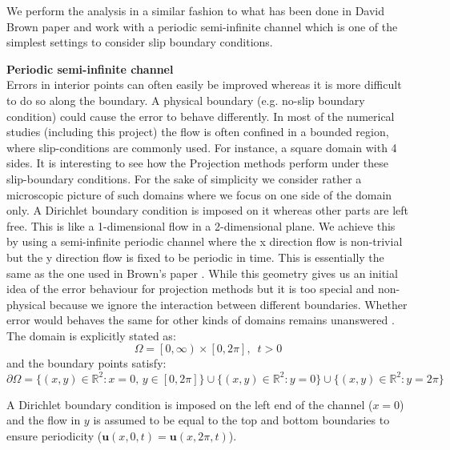 We perform the analysis in a similar fashion to what has been done in David Brown paper \cite{brown2001accurate} and work with a periodic semi-infinite channel which is one of the simplest settings to consider slip boundary conditions.

\textbf{Periodic semi-infinite channel}\\
Errors in interior points can often easily be improved whereas it is more difficult to do so along the boundary. A physical boundary (e.g. no-slip boundary condition) could cause the error to behave differently. In most of the numerical studies (including this project) the flow is often confined in a bounded region, where slip-conditions are commonly used. For instance, a square domain with 4 sides. It is interesting to see how the Projection methods perform under these slip-boundary conditions. For the sake of simplicity we consider rather a microscopic picture of such domains where we focus on one side of the domain only. A Dirichlet boundary condition is imposed on it whereas other parts are left free. This is like a 1-dimensional flow in a 2-dimensional plane. We achieve this by using a semi-infinite periodic channel where the x direction flow is non-trivial but the y direction flow is fixed to be periodic in time. This is essentially the same as the one used in Brown's paper \cite{brown2001accurate}. While this geometry gives us an initial idea of the error behaviour for projection methods but it is too special and non-physical because we ignore the interaction between different boundaries. Whether error would behaves the same for other kinds of domains remains unanswered \cite{pyo2005normal}. \\

The domain is explicitly stated as:
\begin{equation*}
\Omega = \left[0, \infty \right) \times \left[0, 2\pi\right], \, \, \, t>0
\end{equation*}
and the boundary points satisfy:
\begin{equation*}\label{eq:set of boundary points}
\partial \Omega = \{(x,y) \in \mathbb{R}^2: x=0,\,y \in [0, 2\pi]\} \cup \{(x,y) \in \mathbb{R}^2: y = 0 \} \cup \{(x,y) \in \mathbb{R}^2: y = 2\pi \}
\end{equation*}

A Dirichlet boundary condition is imposed on the left end of the channel ($x = 0$) and the flow in $y$ is assumed to be equal to the top and bottom boundaries to ensure periodicity ($\textbf{u}(x,0,t) = \textbf{u}(x,2\pi,t)$).\\


